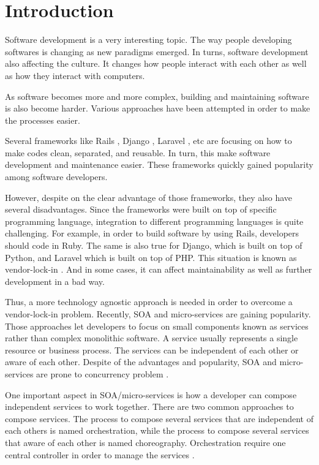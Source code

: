 \documentclass[conference]{IEEEtran}
\begin{document}
\IEEEpeerreviewmaketitle

\section{Introduction}

Software development is a very interesting topic. The way people developing softwares is changing as new paradigms emerged. In turns, software development also affecting the culture. It changes how people interact with each other as well as how they interact with computers.

As software becomes more and more complex, building and maintaining software is also become harder. Various approaches have been attempted in order to make the processes easier.

Several frameworks like Rails \cite{rails}, Django \cite{django}, Laravel \cite{laravel}, etc are focusing on how to make codes clean, separated, and reusable. In turn, this make software development and maintenance easier. These frameworks quickly gained popularity among software developers.

However, despite on the clear advantage of those frameworks, they also have several disadvantages. Since the frameworks were built on top of specific programming language, integration to different programming languages is quite challenging. For example, in order to build software by using Rails, developers should code in Ruby. The same is also true for Django, which is built on top of Python, and Laravel which is built on top of PHP. This situation is known as vendor-lock-in \cite{vendorlock}. And in some cases, it can affect maintainability as well as further development in a bad way.

Thus, a more technology agnostic approach is needed in order to overcome a vendor-lock-in problem. Recently, SOA and micro-services are gaining popularity. Those approaches let developers to focus on small components known as services rather than complex monolithic software. A service usually represents a single resource or business process. The services can be independent of each other or aware of each other. Despite of the advantages and popularity, SOA and micro-services are prone to concurrency problem \cite{soavsmicroservice}.

One important aspect in SOA/micro-services is how a developer can compose independent services to work together. There are two common approaches to compose services. The process to compose several services that are independent of each others is named orchestration, while the process to compose several services that aware of each other is named choreography. Orchestration require one central controller in order to manage the services \cite{orchestrationvschoreography}.
\end{document}
